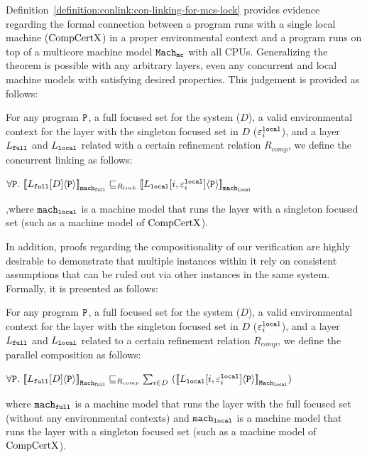 Definition~\ref{definition:conlink:con-linking-for-mcs-lock} 
provides evidence regarding the formal connection between a program runs with a single local machine ($\mathrm{CompCertX}$) in a proper environmental context and a program runs on top of a multicore machine model ${{{{\mathrm{\texttt{Mach}}}}_{\mathrm{\texttt{mc}}}}}$ with all CPUs. 
Generalizing the theorem is possible with any arbitrary layers, even any concurrent and local machine models with satisfying desired properties. This judgement is provided as follows:
\begin{definition}
\label{definition:conlink:concurrent-linking}
For any program $ {\mathrm{\texttt{P}}}$, a full focused set for the system ($D$), a valid environmental context for the layer with the singleton focused set in $D$ (${\varepsilon}^{{\mathrm{\texttt{local}}}}_{i}$), and a layer $L_{{\mathrm{\texttt{full}}}}$ and $L_{{\mathrm{\texttt{local}}}}$ related with a certain 
refinement relation $R_{comp}$, we define the concurrent linking as follows:
\begin{center}
$\forall \codeinmath{P}. \ \semwmachine{L_{\codeinmath{full}}[D]}{\codeinmath{P}}{\codeinmath{mach}_{\codeinmath{full}}} \refines_{R_{link}} \semwmachine{\PLayer{L_{\codeinmath{local}}}{i}{\oracle^{\codeinmath{local}}_{i}}}{\codeinmath{P}}{\codeinmath{mach}_{\codeinmath{local}}}$
\end{center}
,where ${\mathrm{\texttt{mach}}}_{{\mathrm{\texttt{local}}}}$ is a machine model that runs the layer with a singleton focused set (such as a machine model of $\mathrm{CompCertX}$).
\end{definition}
{\noindent}
In addition, proofs regarding the compositionality of our verification are highly desirable to demonstrate that multiple instances within it rely on consistent assumptions that can be ruled out via other instances in the same system. Formally, it is presented as follows:
\begin{definition}
\label{definition:conlink:parallel-composition}
For any program $ {\mathrm{\texttt{P}}}$, a full focused set for the system ($D$), a valid environmental context for the layer with the singleton focused set in $D$ (${\varepsilon}^{{\mathrm{\texttt{local}}}}_{i}$), and a layer $L_{{\mathrm{\texttt{full}}}}$ and $L_{{\mathrm{\texttt{local}}}}$ related to a certain 
refinement relation $R_{comp}$, we define the parallel composition as follows:
\begin{center}
$\forall \codeinmath{P}. \ \semwmachine{L_{\codeinmath{full}}[D]}{\codeinmath{P}}{\machkwd_{\codeinmath{full}}} \refines_{R_{comp}} \sum_{i \in D}\  (\semwmachine{\PLayer{L_{\codeinmath{local}}}{i}{\oracle^{\codeinmath{local}}_i}}{\codeinmath{P}}{\machkwd_{\codeinmath{local}}})$
\end{center}
where  ${\mathrm{\texttt{mach}}}_{{\mathrm{\texttt{full}}}}$ is a machine model that runs the layer with the full focused set (without any environmental contexts) and
${\mathrm{\texttt{mach}}}_{{\mathrm{\texttt{local}}}}$ is a machine model that runs the layer with a singleton focused set (such as a machine model of $\mathrm{CompCertX}$).
\end{definition}


